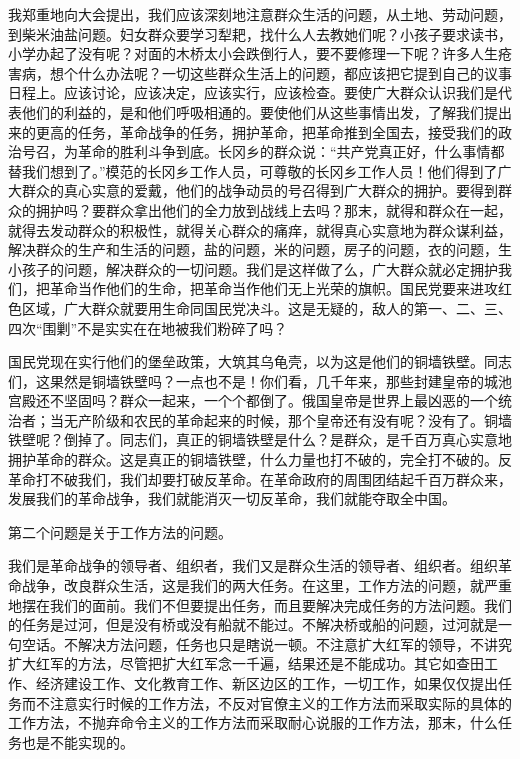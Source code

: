 我郑重地向大会提出，我们应该深刻地注意群众生活的问题，从土地、劳动问题，到柴米油盐问题。妇女群众要学习犁耙，找什么人去教她们呢？小孩子要求读书，小学办起了没有呢？对面的木桥太小会跌倒行人，要不要修理一下呢？许多人生疮害病，想个什么办法呢？一切这些群众生活上的问题，都应该把它提到自己的议事日程上。应该讨论，应该决定，应该实行，应该检查。要使广大群众认识我们是代表他们的利益的，是和他们呼吸相通的。要使他们从这些事情出发，了解我们提出来的更高的任务，革命战争的任务，拥护革命，把革命推到全国去，接受我们的政治号召，为革命的胜利斗争到底。长冈乡的群众说：“共产党真正好，什么事情都替我们想到了。”模范的长冈乡工作人员，可尊敬的长冈乡工作人员！他们得到了广大群众的真心实意的爱戴，他们的战争动员的号召得到广大群众的拥护。要得到群众的拥护吗？要群众拿出他们的全力放到战线上去吗？那末，就得和群众在一起，就得去发动群众的积极性，就得关心群众的痛痒，就得真心实意地为群众谋利益，解决群众的生产和生活的问题，盐的问题，米的问题，房子的问题，衣的问题，生小孩子的问题，解决群众的一切问题。我们是这样做了么，广大群众就必定拥护我们，把革命当作他们的生命，把革命当作他们无上光荣的旗帜。国民党要来进攻红色区域，广大群众就要用生命同国民党决斗。这是无疑的，敌人的第一、二、三、四次“围剿”不是实实在在地被我们粉碎了吗？

国民党现在实行他们的堡垒政策，大筑其乌龟壳，以为这是他们的铜墙铁壁。同志们，这果然是铜墙铁壁吗？一点也不是！你们看，几千年来，那些封建皇帝的城池宫殿还不坚固吗？群众一起来，一个个都倒了。俄国皇帝是世界上最凶恶的一个统治者；当无产阶级和农民的革命起来的时候，那个皇帝还有没有呢？没有了。铜墙铁壁呢？倒掉了。同志们，真正的铜墙铁壁是什么？是群众，是千百万真心实意地拥护革命的群众。这是真正的铜墙铁壁，什么力量也打不破的，完全打不破的。反革命打不破我们，我们却要打破反革命。在革命政府的周围团结起千百万群众来，发展我们的革命战争，我们就能消灭一切反革命，我们就能夺取全中国。

第二个问题是关于工作方法的问题。

我们是革命战争的领导者、组织者，我们又是群众生活的领导者、组织者。组织革命战争，改良群众生活，这是我们的两大任务。在这里，工作方法的问题，就严重地摆在我们的面前。我们不但要提出任务，而且要解决完成任务的方法问题。我们的任务是过河，但是没有桥或没有船就不能过。不解决桥或船的问题，过河就是一句空话。不解决方法问题，任务也只是瞎说一顿。不注意扩大红军的领导，不讲究扩大红军的方法，尽管把扩大红军念一千遍，结果还是不能成功。其它如查田工作、经济建设工作、文化教育工作、新区边区的工作，一切工作，如果仅仅提出任务而不注意实行时候的工作方法，不反对官僚主义的工作方法而采取实际的具体的工作方法，不抛弃命令主义的工作方法而采取耐心说服的工作方法，那末，什么任务也是不能实现的。

